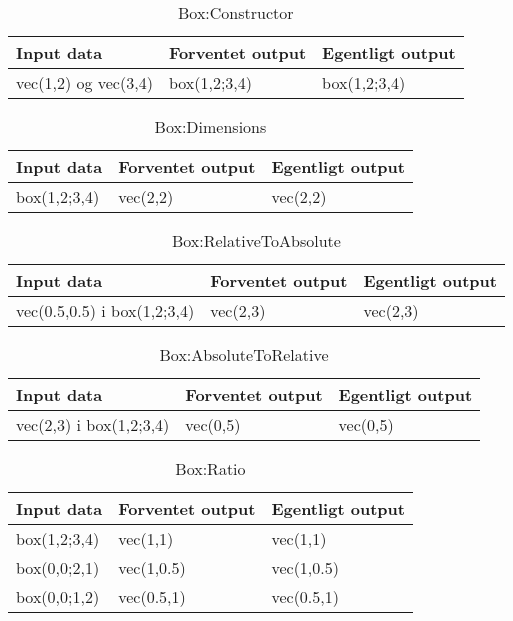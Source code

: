 
\begin{table}[h!]
	\caption{Box:Constructor}
	\centering
	\begin{tabular}{L L L}
		\hline\hline
		Input data & Forventet output & Egentligt output \\ [0.5ex]
		\hline
		vec(1,2) og vec(3,4) & box(1,2;3,4) & box(1,2;3,4)\\
		\hline
	\end{tabular}
\end{table}

\begin{table}[h!]
	\caption{Box:Dimensions}
	\centering
	\begin{tabular}{L L L}
		\hline\hline
		Input data & Forventet output & Egentligt output \\ [0.5ex]
		\hline
		box(1,2;3,4) & vec(2,2) & vec(2,2)\\
		\hline
	\end{tabular}
\end{table}

\begin{table}[h!]
	\caption{Box:RelativeToAbsolute}
	\centering
	\begin{tabular}{L L L}
		\hline\hline
		Input data & Forventet output & Egentligt output \\ [0.5ex]
		\hline
		vec(0.5,0.5) i box(1,2;3,4) & vec(2,3) & vec(2,3)\\
		\hline
	\end{tabular}
\end{table}

\begin{table}[h!]
	\caption{Box:AbsoluteToRelative}
	\centering
	\begin{tabular}{L L L}
		\hline\hline
		Input data & Forventet output & Egentligt output \\ [0.5ex]
		\hline
		vec(2,3) i box(1,2;3,4) & vec(0,5) & vec(0,5)\\
		\hline
	\end{tabular}
\end{table}

\begin{table}[h!]
	\caption{Box:Ratio}
	\centering
	\begin{tabular}{L L L}
		\hline\hline
		Input data & Forventet output & Egentligt output \\ [0.5ex]
		\hline
		box(1,2;3,4) & vec(1,1) & vec(1,1)\\
		box(0,0;2,1) & vec(1,0.5) & vec(1,0.5)\\
		box(0,0;1,2) & vec(0.5,1) & vec(0.5,1)\\
		\hline
	\end{tabular}
\end{table}

